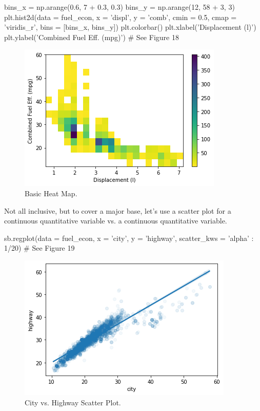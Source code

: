\begin{python}
	bins_x = np.arange(0.6, 7 + 0.3, 0.3)
	bins_y = np.arange(12, 58 + 3, 3)
	plt.hist2d(data = fuel_econ, x = 'displ', y = 'comb', cmin = 0.5, cmap = 'viridis_r', bins = [bins_x, bins_y])
	plt.colorbar()
	plt.xlabel('Displacement (l)')
	plt.ylabel('Combined Fuel Eff. (mpg)')
	# See Figure 18
\end{python}

\begin{figure}
	\includegraphics{images/figure18.png}
	\caption{Basic Heat Map.}\label{fig:figure18}
\end{figure}

Not all inclusive, but to cover a major base, let's use a scatter plot for a continuous quantitative variable vs. a continuous quantitative variable.

\begin{python}
	sb.regplot(data = fuel_econ, x = 'city', y = 'highway', 
	scatter_kws = {'alpha' : 1/20})
	# See Figure 19
\end{python}

\begin{figure}
	\includegraphics{images/figure19.png}
	\caption{City vs. Highway Scatter Plot.}\label{fig:figure19}
\end{figure}

